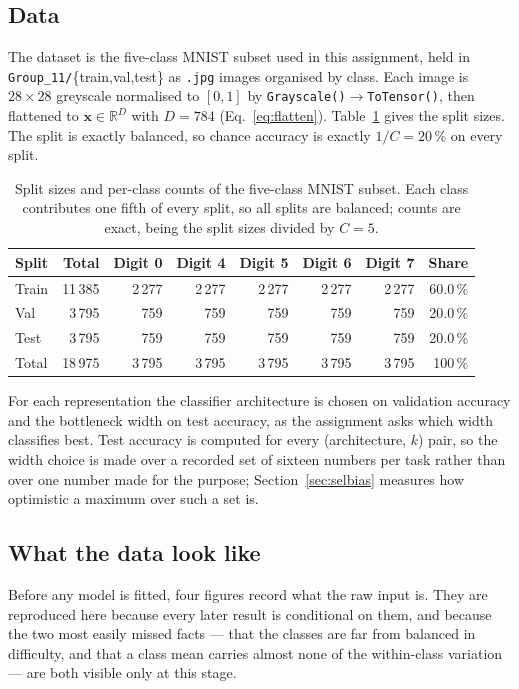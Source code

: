 \documentclass[11pt,a4paper]{article}
\newcommand{\R}{\mathbb{R}}\newcommand{\given}{\mid}\newcommand{\Acc}{\mathrm{Acc}}
\newcommand{\code}[1]{\texttt{#1}}
\begin{document}
\subsection{Data}\label{sec:dataset:data}
The dataset is the five-class MNIST subset used in this assignment, held in
\code{Group\_11/}\{train,val,test\} as \code{.jpg} images organised by class.  Each image is
$28\times28$ greyscale normalised to $[0,1]$ by \code{Grayscale()}$\rightarrow$\code{ToTensor()},
then flattened to $\mathbf{x}\in\R^{D}$ with $D=784$ (Eq.~\eqref{eq:flatten}).  Table~\ref{tab:dataset}
gives the split sizes.  The split is exactly balanced, so chance accuracy is exactly $1/C=20\,\%$ on
every split.

\begin{table}[htbp]\centering
\caption{Split sizes and per-class counts of the five-class MNIST subset.  Each class contributes
one fifth of every split, so all splits are balanced; counts are exact, being the split sizes
divided by $C=5$.}\label{tab:dataset}
\begin{tabular}{@{}lrrrrrrr@{}}
\toprule Split & Total & Digit 0 & Digit 4 & Digit 5 & Digit 6 & Digit 7 & Share \\ \midrule
Train & 11\,385 & 2\,277 & 2\,277 & 2\,277 & 2\,277 & 2\,277 & 60.0\,\% \\
Val   & 3\,795  & 759    & 759    & 759    & 759    & 759    & 20.0\,\% \\
Test & 3\,795  & 759    & 759    & 759    & 759    & 759    & 20.0\,\% \\ \midrule
Total & 18\,975 & 3\,795 & 3\,795 & 3\,795 & 3\,795 & 3\,795 & 100\,\% \\
\bottomrule
\end{tabular}
\end{table}

For each representation the classifier architecture is chosen on validation accuracy and the
bottleneck width on test accuracy, as the assignment asks which width classifies best.  Test
accuracy is computed for every (architecture, $k$) pair, so the width choice is made over a
recorded set of sixteen numbers per task rather than over one number made for the purpose;
Section~\ref{sec:selbias} measures how optimistic a maximum over such a set is.

\subsection{What the data look like}\label{sec:dataset:eda}
Before any model is fitted, four figures record what the raw input is.  They are reproduced
here because every later result is conditional on them, and because the two most easily
missed facts --- that the classes are far from balanced in difficulty, and that a class mean
carries almost none of the within-class variation --- are both visible only at this stage.
\end{document}
